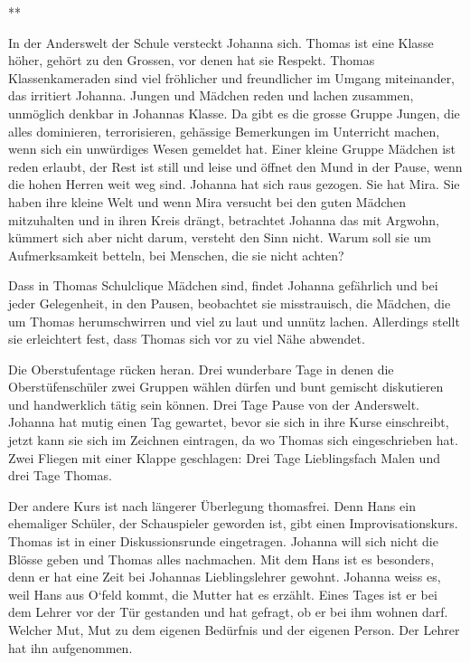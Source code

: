\documentclass[10pt,a5paper]{book}
\newcommand{\sterne}{\par{\centering ***\par}}
\begin{document}
\sterne

In der Anderswelt der Schule versteckt Johanna sich. Thomas ist eine Klasse höher, gehört zu den Grossen, vor denen hat sie Respekt. Thomas Klassenkameraden sind viel fröhlicher und freundlicher im Umgang miteinander, das irritiert Johanna. Jungen und Mädchen reden und lachen zusammen, unmöglich denkbar in Johannas Klasse. Da gibt es die grosse Gruppe Jungen, die alles dominieren, terrorisieren, gehässige Bemerkungen im Unterricht machen, wenn sich ein unwürdiges Wesen gemeldet hat. Einer kleine Gruppe Mädchen ist reden erlaubt, der Rest ist still und leise und öffnet den Mund in der Pause, wenn die hohen Herren weit weg sind. Johanna hat sich raus gezogen. Sie hat Mira. Sie haben ihre kleine Welt und wenn Mira versucht bei den guten Mädchen mitzuhalten und in ihren Kreis drängt, betrachtet Johanna das mit Argwohn, kümmert sich aber nicht darum, versteht den Sinn nicht. Warum soll sie um Aufmerksamkeit betteln, bei Menschen, die sie nicht achten?

 Dass in Thomas Schulclique Mädchen sind, findet Johanna gefährlich und bei jeder Gelegenheit, in den Pausen, beobachtet sie misstrauisch, die Mädchen, die um Thomas herumschwirren und viel zu laut und unnütz lachen. Allerdings stellt sie erleichtert fest, dass Thomas sich vor zu viel Nähe abwendet. 
 
Die Oberstufentage rücken heran. Drei wunderbare Tage in denen die Oberstüfenschüler zwei Gruppen wählen dürfen und bunt gemischt diskutieren und handwerklich tätig sein können. Drei Tage Pause von der Anderswelt. Johanna hat mutig einen Tag gewartet, bevor sie sich in ihre Kurse einschreibt, jetzt kann sie sich im Zeichnen eintragen, da wo Thomas sich eingeschrieben hat. Zwei Fliegen mit einer Klappe geschlagen: Drei Tage Lieblingsfach Malen und drei Tage Thomas.

Der andere Kurs ist nach längerer Überlegung thomasfrei. Denn Hans ein ehemaliger Schüler, der Schauspieler geworden ist, gibt einen Improvisationskurs. Thomas ist in einer Diskussionsrunde eingetragen. Johanna will sich nicht die Blösse geben und Thomas alles nachmachen. 
Mit dem Hans ist es besonders, denn er hat eine Zeit bei Johannas Lieblingslehrer gewohnt. Johanna weiss es, weil Hans aus O`feld kommt, die Mutter hat es erzählt. Eines Tages ist er bei dem Lehrer vor der Tür gestanden und hat gefragt, ob er bei ihm wohnen darf. Welcher Mut, Mut zu dem eigenen Bedürfnis und der eigenen Person. Der Lehrer hat ihn aufgenommen. 
\end{document}
